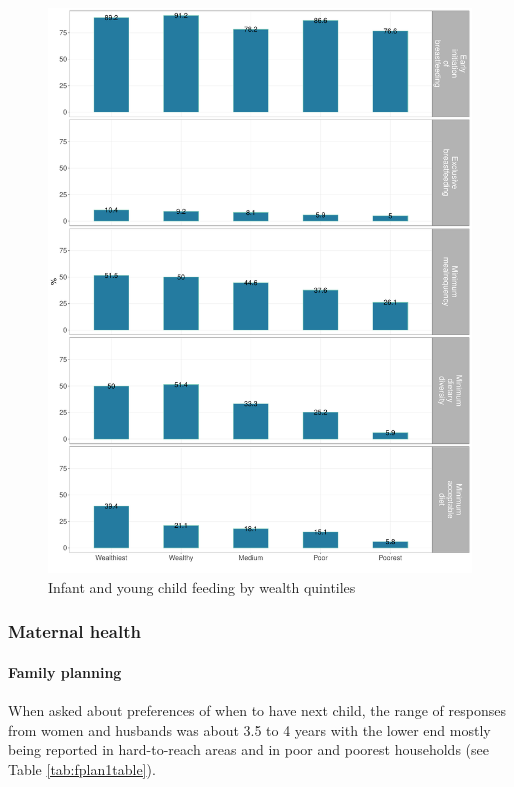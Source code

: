 \documentclass[12pt,a4paper]{article}
\let\oldparagraph\paragraph
\renewcommand{\paragraph}[1]{\oldparagraph{#1}\mbox{}}
\begin{document}
\begin{figure}[H]

{\centering \includegraphics{kayahReport_files/figure-latex/iycf2plot-1} 

}

\caption{Infant and young child feeding by wealth quintiles}\label{fig:iycf2plot}
\end{figure}

\hypertarget{mhealth-results}{%
\subsubsection{Maternal health}\label{mhealth-results}}

\hypertarget{fplan-results}{%
\paragraph{Family planning}\label{fplan-results}}

When asked about preferences of when to have next child, the range of responses from women and husbands was about 3.5 to 4 years with the lower end mostly being reported in hard-to-reach areas and in poor and poorest households (see Table \ref{tab:fplan1table}).
\end{document}
